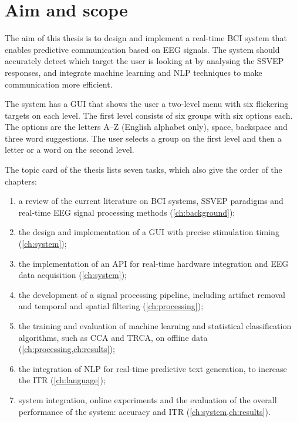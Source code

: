 \section{Aim and scope}
\label{sec:aim}

The aim of this thesis is to design and implement a real-time \ac{BCI} system that
enables predictive communication based on \ac{EEG} signals. The system should accurately
detect which target the user is looking at by analysing the \ac{SSVEP} responses, and
integrate machine learning and \ac{NLP} techniques to make communication more efficient.

The system has a \ac{GUI} that shows the user a two-level menu with six flickering targets
on each level. The first level consists of six groups with six options each. The options
are the letters A--Z (English alphabet only), space, backspace and three word suggestions.
The user selects a group on the first level and then a letter or a word on the second
level.

The topic card of the thesis lists seven tasks, which also give the order of the chapters:
\begin{enumerate}
  \item a review of the current literature on \ac{BCI} systems, \ac{SSVEP} paradigms and
        real-time \ac{EEG} signal processing methods (\cref{ch:background});
  \item the design and implementation of a \ac{GUI} with precise stimulation timing
        (\cref{ch:system});
  \item the implementation of an \ac{API} for real-time hardware integration and \ac{EEG}
        data acquisition (\cref{ch:system});
  \item the development of a signal processing pipeline, including artifact removal and
        temporal and spatial filtering (\cref{ch:processing});
  \item the training and evaluation of machine learning and statistical classification
        algorithms, such as \ac{CCA} and \ac{TRCA}, on offline data (\cref{ch:processing,ch:results});
  \item the integration of \ac{NLP} for real-time predictive text generation, to
        increase the \ac{ITR} (\cref{ch:language});
  \item system integration, online experiments and the evaluation of the overall
        performance of the system: accuracy and \ac{ITR} (\cref{ch:system,ch:results}).
\end{enumerate}

